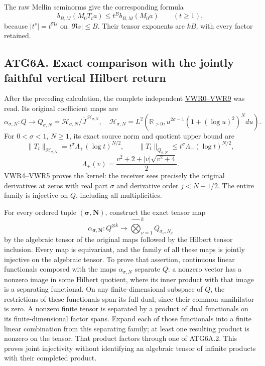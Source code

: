 The raw Mellin seminorms give the corresponding formula \[
b_{B,M}(M_0T_ta)\le t^B b_{B,M}(M_0a)\qquad(t\ge1),
\tag{ATG6.6}
\] because \(|t^s|=t^{\Re s}\) on \(|\Re s|\le B\). Their tensor
exponents are \(kB\), with every factor retained.

\subsection{ATG6A. Exact comparison with the jointly faithful vertical
Hilbert
return}\label{atg6a.-exact-comparison-with-the-jointly-faithful-vertical-hilbert-return}

After the preceding calculation, the complete independent
\href{https://github.com/KokunoYumeto/zeta-function-research-reader/blob/main/workbenches/splitzero-tandem/continuations/20260925-full-source-tensor-and-original-divisor/counterfactual/FULL_VERTICAL_WEIGHT_RETURN.md}{VWR0--VWR9}
was read. Its original coefficient maps are \[
\alpha_{\sigma,N}:Q\longrightarrow
Q_{\sigma,N}=\mathcal H_{\sigma,N}/\overline J^{\,\mathcal H_{\sigma,N}},
\quad
\mathcal H_{\sigma,N}=
L^2(\mathbb R_{>0},u^{2\sigma-1}(1+(\log u)^2)^Ndu).
\] For \(0<\sigma<1\), \(N\ge1\), its exact source norm and quotient
upper bound are \[
\|T_t\|_{\mathcal H_{\sigma,N}}
=t^\sigma\Lambda_+(\log t)^{N/2},\qquad
\|T_t\|_{Q_{\sigma,N}}\le
t^\sigma\Lambda_+(\log t)^{N/2},
\] \[
\Lambda_+(v)=\frac{v^2+2+|v|\sqrt{v^2+4}}2.
\tag{ATG6A.1}
\] VWR4--VWR5 proves the kernel: the receiver sees precisely the
original derivatives at zeros with real part \(\sigma\) and derivative
order \(j<N-1/2\). The entire family is injective on \(Q\), including
all multiplicities.

For every ordered tuple \((\boldsymbol\sigma,\boldsymbol N)\), construct
the exact tensor map \[
\alpha_{\boldsymbol\sigma,\boldsymbol N}:
Q^{\otimes k}\longrightarrow
\widehat{\bigotimes}_{\nu=1}^k Q_{\sigma_\nu,N_\nu}
\tag{ATG6A.2}
\] by the algebraic tensor of the original maps followed by the Hilbert
tensor inclusion. Every map is equivariant, and the family of all these
maps is jointly injective on the algebraic tensor. To prove that
assertion, continuous linear functionals composed with the maps
\(\alpha_{\sigma,N}\) separate \(Q\): a nonzero vector has a nonzero
image in some Hilbert quotient, where its inner product with that image
is a separating functional. On any finite-dimensional subspace of \(Q\),
the restrictions of these functionals span its full dual, since their
common annihilator is zero. A nonzero finite tensor is separated by a
product of dual functionals on its finite-dimensional factor spans.
Expand each of those functionals into a finite linear combination from
this separating family; at least one resulting product is nonzero on the
tensor. That product factors through one of ATG6A.2. This proves joint
injectivity without identifying an algebraic tensor of infinite products
with their completed product.


